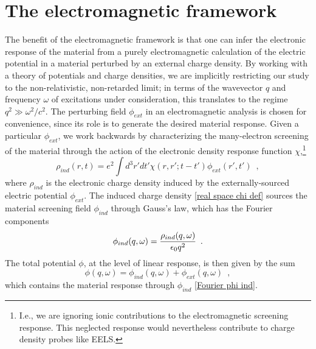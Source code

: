 \section{The electromagnetic framework}
\label{section: electromagnetic framework}

The benefit of the electromagnetic framework is that one can infer the electronic response of the material from a purely electromagnetic calculation of the electric potential in a material perturbed by an external charge density.  By working with a theory of potentials and charge densities, we are implicitly restricting our study to the non-relativistic, non-retarded limit; in terms of the wavevector $q$ and frequency $\omega$ of excitations under consideration, this translates to the regime $q^2\gg \omega^2/c^2$.  The perturbing field $\phi_{ext}$ in an electromagnetic analysis is chosen for convenience, since its role is to generate the desired material response.  Given a particular $\phi_{ext}$, we work backwards by characterizing the many-electron screening of the material through the action of the electronic density response function $\chi$,\footnote{I.e., we are ignoring ionic contributions to the electromagnetic screening response.  This neglected response would nevertheless contribute to charge density probes like EELS.}
\begin{equation}
    \label{real space chi def}
    \rho_{ind}(r,t) = e^2\int d^3 r' dt' \chi(r,r';t-t')\phi_{ext}(r',t')
    \,\,\,,
\end{equation}
where $\rho_{ind}$ is the electronic charge density induced by the externally-sourced electric potential $\phi_{ext}$.  The induced charge density \eqref{real space chi def} sources the material screening field $\phi_{ind}$ through Gauss's law, which has the Fourier components
\begin{equation}
    \label{Fourier phi ind}
    \phi_{ind}(q,\omega) = \frac{\rho_{ind}(q,\omega)}{\epsilon_0 q^2}
    \,\,\,.
\end{equation}
The total potential $\phi$, at the level of linear response, is then given by the sum
\begin{equation}
    \label{phi def}
    \phi(q,\omega) = \phi_{ind}(q,\omega) + \phi_{ext}(q,\omega)
    \,\,\,,
\end{equation}
which contains the material response through $\phi_{ind}$ \eqref{Fourier phi ind}.  

